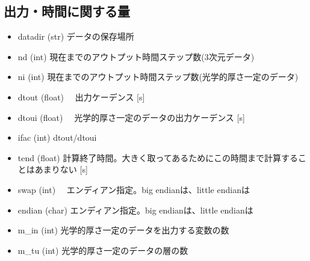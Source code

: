 \documentclass[letterpaper,10pt,dvipdfmx,report]{sphinxmanual}
\begin{document}
\subsection{出力・時間に関する量}
\label{\detokenize{notation:id1}}\begin{itemize}
\item {} 
datadir (str) \sphinxhyphen{}\sphinxhyphen{} データの保存場所

\item {} 
nd (int) \sphinxhyphen{}\sphinxhyphen{} 現在までのアウトプット時間ステップ数(3次元データ)

\item {} 
ni (int) \sphinxhyphen{}\sphinxhyphen{} 現在までのアウトプット時間ステップ数(光学的厚さ一定のデータ)

\item {} 
dtout (float) \sphinxhyphen{}\sphinxhyphen{}　出力ケーデンス {[}s{]}

\item {} 
dtoui (float) \sphinxhyphen{}\sphinxhyphen{}　光学的厚さ一定のデータの出力ケーデンス {[}s{]}

\item {} 
ifac (int) \sphinxhyphen{}\sphinxhyphen{} dtout/dtoui

\item {} 
tend (float) \sphinxhyphen{}\sphinxhyphen{} 計算終了時間。大きく取ってあるためにこの時間まで計算することはあまりない {[}s{]}

\item {} 
swap (int) \sphinxhyphen{}\sphinxhyphen{}　エンディアン指定。big endianは、little endianは

\item {} 
endian (char) \sphinxhyphen{}\sphinxhyphen{} エンディアン指定。big endianは、little endianは

\item {} 
m\_in (int) \sphinxhyphen{}\sphinxhyphen{} 光学的厚さ一定のデータを出力する変数の数

\item {} 
m\_tu (int) \sphinxhyphen{}\sphinxhyphen{} 光学的厚さ一定のデータの層の数

\end{itemize}
\end{document}
